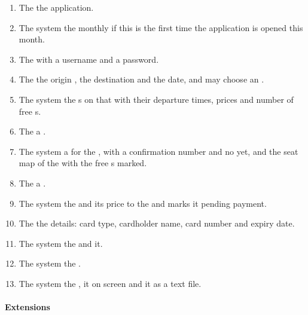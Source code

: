 \begin{enumerate}
\item The   the application.
\item The system  the monthly  if this is the first
  time the application is opened this month.
\item The   with a username and a password.
\item The   the origin , the destination
   and the date, and may choose an .
\item The system  the s on that  with their
  departure times, prices and number of free s.
\item The   a .
\item The system  a  for the , with
  a confirmation number and no  yet, and  the seat map of
  the  with the free s marked.
\item The   a .
\item The system  the  and its price to the
   and marks it pending payment.
\item The   the  details: card type,
  cardholder name, card number and expiry date.
\item The system  the  and  it.
\item The system  the .
\item The system  the ,  it on screen
  and  it as a text file.
\end{enumerate}

\paragraph{Extensions}

